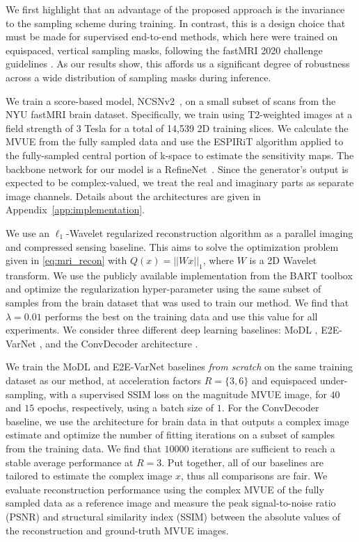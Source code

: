 We first highlight that an advantage of the proposed approach is the
invariance to the sampling scheme during training. In contrast, this
is a design choice that must be made for supervised end-to-end
methods, which here were trained on equispaced, vertical sampling
masks, following the fastMRI 2020 challenge guidelines
\cite{zbontar2018fastMRI,muckleyfastmri2020}. As our results show,
this affords us a significant degree of robustness across a wide
distribution of sampling masks during inference.

We train a score-based model, NCSNv2~\cite{song2020improved}, on a
small subset of scans from the NYU fastMRI brain dataset.
Specifically, we train using T2-weighted images at a field strength of
3 Tesla for a total of 14,539 2D training slices.  We calculate the
MVUE from the fully sampled data and use the ESPIRiT algorithm
\cite{uecker2014espirit,iyer2020autoespirit} applied to the
fully-sampled central portion of k-space to estimate the sensitivity
maps.  The backbone network for our model is a
RefineNet~\cite{lin2017refinenet}.  Since the generator's output is
expected to be complex-valued, we treat the real and imaginary parts
as separate image channels. Details about the architectures are given
in Appendix~\ref{app:implementation}.


We use an $\ell_1$-Wavelet regularized reconstruction algorithm
\cite{lustig2007sparse} as a parallel imaging and compressed sensing
baseline.  This aims to solve the optimization problem given in
\eqref{eq:mri_recon} with $Q(x) = ||Wx||_1$, where $W$ is a 2D Wavelet
transform.  We use the publicly available implementation from the BART
toolbox \cite{uecker2015berkeley,bart} and optimize the regularization
hyper-parameter using the same subset of samples from the brain
dataset that was used to train our method. We find that $\lambda =
0.01$ performs the best on the training data and use this value for
all experiments.  We consider three different deep learning baselines:
MoDL \cite{aggarwal2018modl}, E2E-VarNet \cite{sriram2020end}, and the
ConvDecoder architecture \cite{darestani2021measuring}. 

We train the MoDL and E2E-VarNet baselines \textit{from scratch} on
the same training dataset as our method, at acceleration factors
$R=\{3,6\}$ and equispaced under-sampling, with a supervised SSIM loss
on the magnitude MVUE image, for $40$ and $15$ epochs, respectively,
using a batch size of $1$. For the ConvDecoder baseline, we use the
architecture for brain data in \cite{darestani2021measuring} that
outputs a complex image estimate and optimize the number of fitting
iterations on a subset of samples from the training data. We find that
$10000$ iterations are sufficient to reach a stable average
performance at $R=3$. Put together, all of our baselines are tailored
to estimate the complex image $x$, thus all comparisons are fair. We
evaluate reconstruction performance using the complex MVUE of the
fully sampled data as a reference image and measure the peak
signal-to-noise ratio (PSNR) and structural similarity index (SSIM)
\cite{wang2006modern} between the absolute values of the
reconstruction and ground-truth MVUE images.

